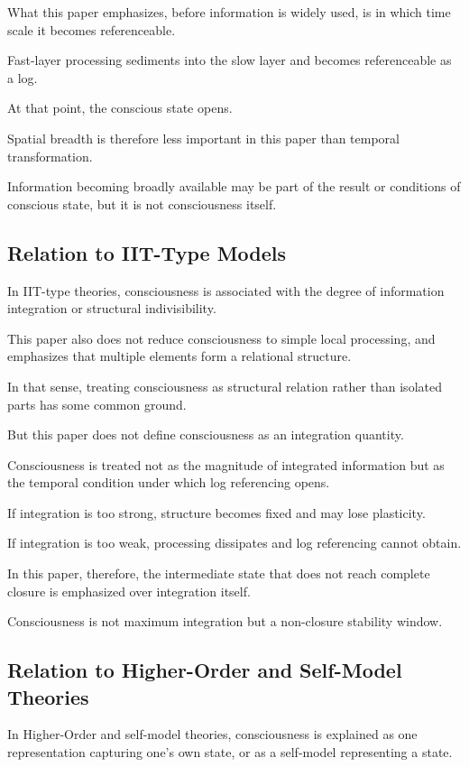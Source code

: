 What this paper emphasizes, before information is widely used, is in which time scale it becomes referenceable.

Fast-layer processing sediments into the slow layer and becomes referenceable as a log.

At that point, the conscious state opens.

Spatial breadth is therefore less important in this paper than temporal transformation.

Information becoming broadly available may be part of the result or conditions of conscious state, but it is not consciousness itself.

\subsection{Relation to IIT-Type Models}


In IIT-type theories, consciousness is associated with the degree of information integration or structural indivisibility.

This paper also does not reduce consciousness to simple local processing, and emphasizes that multiple elements form a relational structure.

In that sense, treating consciousness as structural relation rather than isolated parts has some common ground.

But this paper does not define consciousness as an integration quantity.

Consciousness is treated not as the magnitude of integrated information but as the temporal condition under which log referencing opens.

If integration is too strong, structure becomes fixed and may lose plasticity.

If integration is too weak, processing dissipates and log referencing cannot obtain.

In this paper, therefore, the intermediate state that does not reach complete closure is emphasized over integration itself.

Consciousness is not maximum integration but a non-closure stability window.

\subsection{Relation to Higher-Order and Self-Model Theories}


In Higher-Order and self-model theories, consciousness is explained as one representation capturing one's own state, or as a self-model representing a state.

